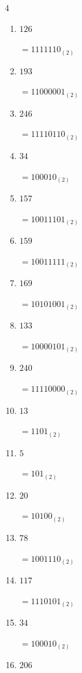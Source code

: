 \begin{multicols}{4}
\begin{enumerate}
        $=10101000_{(2)}$

  \item $126$

        $=1111110_{(2)}$

  \item $193$

        $=11000001_{(2)}$

  \item $246$

        $=11110110_{(2)}$

  \item $34$

        $=100010_{(2)}$

  \item $157$

        $=10011101_{(2)}$

  \item $159$

        $=10011111_{(2)}$

\columnbreak %

  \item $169$

        $=10101001_{(2)}$

  \item $133$

        $=10000101_{(2)}$

  \item $240$

        $=11110000_{(2)}$

  \item $13$

        $=1101_{(2)}$

  \item $5$

        $=101_{(2)}$

  \item $20$

        $=10100_{(2)}$

  \item $78$

        $=1001110_{(2)}$

  \item $117$

        $=1110101_{(2)}$

  \item $34$

        $=100010_{(2)}$

  \item $206$


\end{enumerate}
\end{multicols}
